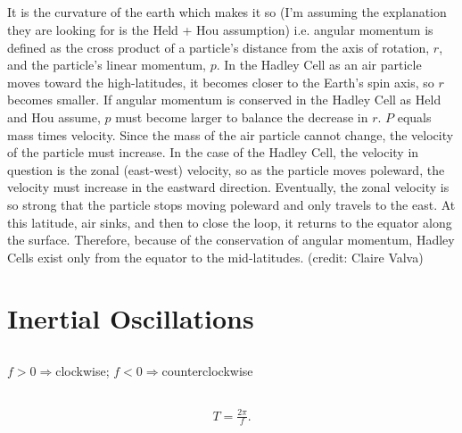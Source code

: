 \documentclass[11pt,letterpaper]{book}
\theoremstyle{definition}
\begin{document}
\subsection{}
It is the curvature of the earth which makes it so (I'm assuming the explanation they are looking for is the Held + Hou assumption) i.e. angular momentum is defined as the cross product of a particle's distance from the axis of rotation, $r$, and the particle's linear momentum, $p$. In the Hadley Cell as an air particle moves toward the high-latitudes, it becomes closer to the Earth's spin axis, so $r$ becomes smaller. If angular momentum is conserved in the Hadley Cell as Held and Hou \cite{HeldHou} assume, $p$ must become larger to balance the decrease in $r$. $P$ equals mass times velocity. Since the mass of the air particle cannot change, the velocity of the particle must increase. In the case of the Hadley Cell, the velocity in question is the zonal (east-west) velocity, so as the particle moves poleward, the velocity must increase in the eastward direction. Eventually, the zonal velocity is so strong that the particle stops moving poleward and only travels to the east. At this latitude, air sinks, and then to close the loop, it returns to the equator along the surface. Therefore, because of the conservation of angular momentum, Hadley Cells exist only from the equator to the mid-latitudes. (credit: Claire Valva)

\section{Inertial Oscillations}
\subsection{}
\subsection{}
\subsection{}
$f>0\Rightarrow $clockwise; $f<0\Rightarrow $counterclockwise

\subsection{}
\begin{align*}
T = \frac{2\pi}{f}.
\end{align*}
\end{document}

